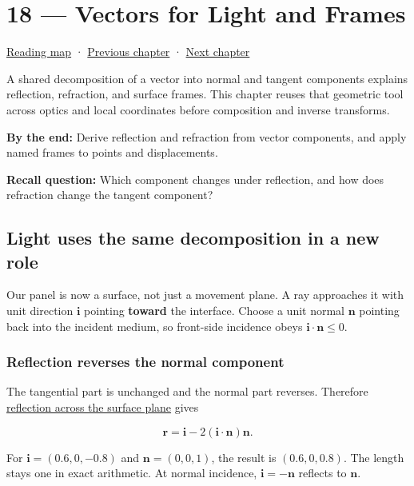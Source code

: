 \hypertarget{01-foundations-i-ch018}{}
\chapter{18 --- Vectors for Light and Frames}\label{01-foundations-i-ch018-vectors-for-light-and-frames}

\hyperref[volume-reading-map]{Reading map} · \hyperref[01-foundations-i-ch017]{Previous chapter} · \hyperref[01-foundations-i-ch019]{Next chapter}

A shared decomposition of a vector into normal and tangent components explains reflection, refraction, and surface frames. This chapter reuses that geometric tool across optics and local coordinates before composition and inverse transforms.

\textbf{By the end:} Derive reflection and refraction from vector components, and apply named frames to points and displacements.

\textbf{Recall question:} Which component changes under reflection, and how does refraction change the tangent component?

\section{Light uses the same decomposition in a new role}\label{01-foundations-i-ch018-light-uses-the-same-decomposition-in-a-new-role}

Our panel is now a surface, not just a movement plane. A ray approaches it with unit direction \(\mathbf i\) pointing \textbf{toward} the interface. Choose a unit normal \(\mathbf n\) pointing back into the incident medium, so front-side incidence obeys \(\mathbf i\cdot\mathbf n\le0\).

\subsection{Reflection reverses the normal component}\label{01-foundations-i-ch018-reflection-reverses-the-normal-component}

The tangential part is unchanged and the normal part reverses. Therefore \hyperref[01-foundations-i-ch018-light-uses-the-same-decomposition-in-a-new-role]{reflection across the surface plane} gives

\[
\mathbf r=\mathbf i-2(\mathbf i\cdot\mathbf n)\mathbf n.
\]

For \(\mathbf i=(0.6,0,-0.8)\) and \(\mathbf n=(0,0,1)\), the result is \((0.6,0,0.8)\). The length stays one in exact arithmetic. At normal incidence, \(\mathbf i=-\mathbf n\) reflects to \(\mathbf n\).

